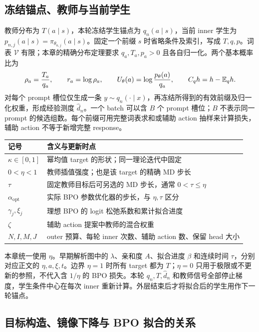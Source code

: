 \subsection{冻结锚点、教师与当前学生}

教师分布为 $T(a\mid s)$，本轮冻结学生锚点为 $q_n(a\mid s)$，当前 inner 学生为 $p_{n,j}(a\mid s)=\pi_{\theta_{n,j}}(a\mid s)$。固定一个前缀 $s$ 时省略条件及索引，写成 $T,q,p$。词表 $\mathcal V$ 有限；本章的精确分布定理要求 $q_a,T_a,p_a>0$ 且各自归一化。两个基本概率比为
\begin{equation}
 \rho_a=\frac{T_a}{q_a},\qquad r_a=\log\rho_a,\qquad
 U_\theta(a)=\log\frac{p_\theta(a)}{q_a},\qquad
 C_qh=h-\mathbb E_qh.
 \label{eq:power-chapter-ratios}
\end{equation}
对每个 prompt 槽位仅生成一条 $y\sim q_n(\cdot\mid x)$，再冻结所得到的有效前缀及归一化权重，形成经验测度 $\widehat d_n$。一个 batch 可以含 $B$ 个 prompt 槽位；$B$ 不表示同一 prompt 的候选组数。每个前缀可用完整词表求和或辅助 action 抽样来计算损失，辅助 action 不等于新增完整 response。

\begin{center}
\begin{tabular}{lp{108mm}}
\toprule
记号 & 含义与更新时点\\
\midrule
$\kappa\in[0,1]$ & 幂均值 target 的形状；同一理论迭代中固定\\
$0<\eta<1$ & 教师插值强度；也是该 target 的精确 MD 步长\\
$\tau$ & 固定教师目标后可另选的 MD 步长，通常 $0<\tau\le\eta$\\
$\alpha_{\mathrm{opt}}$ & 实际 BPO 参数优化器的步长，与 $\eta,\tau$ 区分\\
$\gamma_j,\xi_j$ & 理想 BPO 的 logit 松弛系数和累计拟合进度\\
$\zeta$ & 辅助 action 提案中教师的混合权重\\
$N,I,M,J$ & outer 预算、每轮 inner 次数、辅助 action 数、保留 head 大小\\
\bottomrule
\end{tabular}
\end{center}

本章统一使用 $\eta$。早期解析图中的 $\lambda$、亲和度 $A$、拟合进度 $\beta$ 和连续时间 $\tau$，分别对应正文的 $\eta,a,\xi,t$。边界 $\eta=1$ 时所有 target 都为 $T$；$\eta=0$ 只用于极限或不更新的参照，不代入含 $1/\eta$ 的 BPO 损失。本轮 $q_n,T,\widehat d_n$ 和教师信号全部停止梯度，学生条件中心在每次 inner 重新计算。外层结束后才将拟合后的学生用作下一轮锚点。

\subsection{目标构造、镜像下降与 BPO 拟合的关系}

